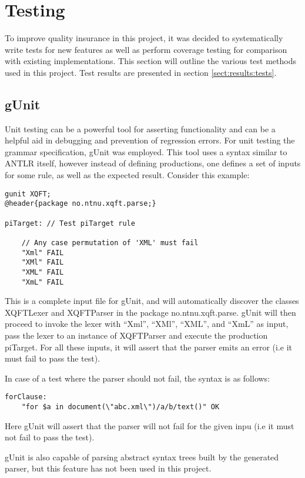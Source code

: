 \section{Testing}
\label{sect:method:testing}
To improve quality insurance in this project, it was decided to systematically
write tests for new features as well as perform coverage testing for comparison
with existing implementations. This section will outline the various test
methods used in this project. Test results are presented in section \ref{sect:results:tests}.

\subsection{gUnit}
\label{sect:method:gUnit}
Unit testing can be a powerful tool for asserting functionality and can be a
helpful aid in debugging and prevention of regression errors.  For unit testing the
grammar specification, gUnit \cite{gunit00} was employed. This tool uses a
syntax similar to ANTLR itself, however instead of defining productions, one
defines a set of inputs for some rule, as well as the expected result. Consider
this example:

\begin{Verbatim}
gunit XQFT;
@header{package no.ntnu.xqft.parse;}

piTarget: // Test piTarget rule

    // Any case permutation of 'XML' must fail
    "Xml" FAIL
    "XMl" FAIL
    "XML" FAIL
    "XmL" FAIL
\end{Verbatim}

This is a complete input file for gUnit, and will automatically discover the
classes XQFTLexer and XQFTParser in the package no.ntnu.xqft.parse. gUnit will
then proceed to invoke the lexer with ``Xml'', ``XMl'', ``XML'', and ``XmL'' as
input, pass the lexer to an instance of XQFTParser and execute the production
piTarget. For all these inputs, it will assert that the parser emits an error
(i.e it must fail to pass the test).

In case of a test where the parser should not fail, the syntax is as follows:
\begin{Verbatim}
forClause:
	"for $a in document(\"abc.xml\")/a/b/text()" OK
\end{Verbatim}
Here gUnit will assert that the parser will not fail for the given inpu (i.e it
must not fail to pass the test).

gUnit is also capable of parsing abstract syntax trees built by the generated
parser, but this feature has not been used in this project.

